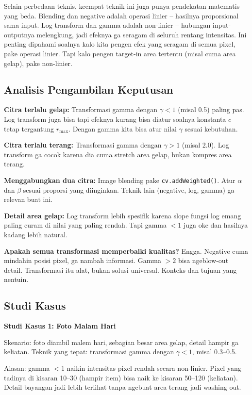 \documentclass[11pt,a4paper]{article}
\begin{document}
Selain perbedaan teknis, keempat teknik ini juga punya pendekatan matematis yang beda. Blending dan negative adalah operasi linier -- hasilnya proporsional sama input. Log transform dan gamma adalah non-linier -- hubungan input-outputnya melengkung, jadi efeknya ga seragam di seluruh rentang intensitas. Ini penting dipahami soalnya kalo kita pengen efek yang seragam di semua pixel, pake operasi linier. Tapi kalo pengen target-in area tertentu (misal cuma area gelap), pake non-linier.

\subsection{Analisis Pengambilan Keputusan}

\textbf{Citra terlalu gelap:} Transformasi gamma dengan $\gamma < 1$ (misal 0.5) paling pas. Log transform juga bisa tapi efeknya kurang bisa diatur soalnya konstanta $c$ tetap tergantung $r_{\max}$. Dengan gamma kita bisa atur nilai $\gamma$ sesuai kebutuhan.

\textbf{Citra terlalu terang:} Transformasi gamma dengan $\gamma > 1$ (misal 2.0). Log transform ga cocok karena dia cuma stretch area gelap, bukan kompres area terang.

\textbf{Menggabungkan dua citra:} Image blending pake \texttt{cv.addWeighted()}. Atur $\alpha$ dan $\beta$ sesuai proporsi yang diinginkan. Teknik lain (negative, log, gamma) ga relevan buat ini.

\textbf{Detail area gelap:} Log transform lebih spesifik karena slope fungsi log emang paling curam di nilai yang paling rendah. Tapi gamma $< 1$ juga oke dan hasilnya kadang lebih natural.

\textbf{Apakah semua transformasi memperbaiki kualitas?} Engga. Negative cuma mindahin posisi pixel, ga nambah informasi. Gamma $> 2$ bisa ngeblow-out detail. Transformasi itu alat, bukan solusi universal. Konteks dan tujuan yang nentuin.

\subsection{Studi Kasus}

\textbf{Studi Kasus 1: Foto Malam Hari}

Skenario: foto diambil malem hari, sebagian besar area gelap, detail hampir ga keliatan. Teknik yang tepat: transformasi gamma dengan $\gamma < 1$, misal 0.3--0.5.

Alasan: gamma $< 1$ naikin intensitas pixel rendah secara non-linier. Pixel yang tadinya di kisaran 10--30 (hampir item) bisa naik ke kisaran 50--120 (keliatan). Detail bayangan jadi lebih terlihat tanpa ngebuat area terang jadi washing out.
\end{document}
